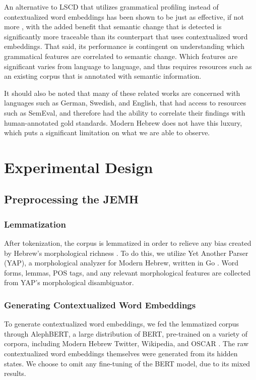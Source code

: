 \documentclass[10pt, a4paper]{article}
\begin{document}
An alternative to LSCD that utilizes grammatical profiling instead of contextualized word embeddings has been shown to be just as effective, if not more \cite{grammaticalprofiling}, with the added benefit that semantic change that is detected is significantly more traceable than its counterpart that uses contextualized word embeddings. That said, its performance is contingent on understanding which grammatical features are correlated to semantic change. Which features are significant varies from language to language, and thus requires resources such as an existing corpus that is annotated with semantic information.

It should also be noted that many of these related works are concerned with languages such as German, Swedish, and English, that had access to resources such as SemEval, and therefore had the ability to correlate their findings with human-annotated gold standards. Modern Hebrew does not have this luxury, which puts a significant limitation on what we are able to observe.
\section{Experimental Design}

\subsection{Preprocessing the JEMH}

\subsubsection{Lemmatization}
After tokenization, the corpus is lemmatized in order to relieve any bias created by Hebrew's morphological richness \cite{Laicher2021}. To do this, we utilize Yet Another Parser (YAP), a morphological analyzer for Modern Hebrew, written in Go \cite{yap}. Word forms, lemmas, POS tags, and any relevant morphological features are collected from YAP's morphological disambiguator.  

\subsubsection{Generating Contextualized Word Embeddings}
To generate contextualized word embeddings, we fed the lemmatized corpus through AlephBERT, a large distribution of BERT, pre-trained on a variety of corpora, including Modern Hebrew Twitter, Wikipedia, and OSCAR \cite{alephBERT}. The raw contextualized word embeddings themselves were generated from its hidden states. We choose to omit any fine-tuning of the BERT model, due to its mixed results.
\end{document}
